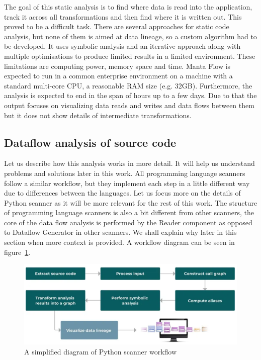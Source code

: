 \par
The goal of this static analysis is to find where data is read into the application, track it across all transformations and then find where it is written out. This proved to be a difficult task. There are several approaches for static code analysis, but none of them is aimed at data lineage, so a custom algorithm had to be developed. It uses symbolic analysis and an iterative approach along with multiple optimisations to produce limited results in a limited environment. These limitations are computing power, memory space and time. Manta Flow is expected to run in a common enterprise environment on a machine with a standard multi-core CPU, a reasonable RAM size (e.g. 32GB). Furthermore, the analysis is expected to end in the span of hours up to a few days. Due to that the output focuses on visualizing data reads and writes and data flows between them but it does not show details of intermediate transformations.

\subsection{Dataflow analysis of source code}

Let us describe how this analysis works in more detail. It will help us understand problems and solutions later in this work. All programming language scanners follow a similar workflow, but they implement each step in a little different way due to differences between the languages. Let us focus more on the details of Python scanner as it will be more relevant for the rest of this work. The structure of programming language scanners is also a bit different from other scanners, the core of the data flow analysis is performed by the Reader component as opposed to Dataflow Generator in other scanners. We shall explain why later in this section when more context is provided. A workflow diagram can be seen in figure~\ref{fig02:pythonWorkflow}.

\begin{figure}[ht]\centering
\includegraphics[width=1.0\textwidth]{img/python_workflow.PNG}
\caption{A simplified diagram of Python scanner workflow}
\label{fig02:pythonWorkflow}
\end{figure}  


